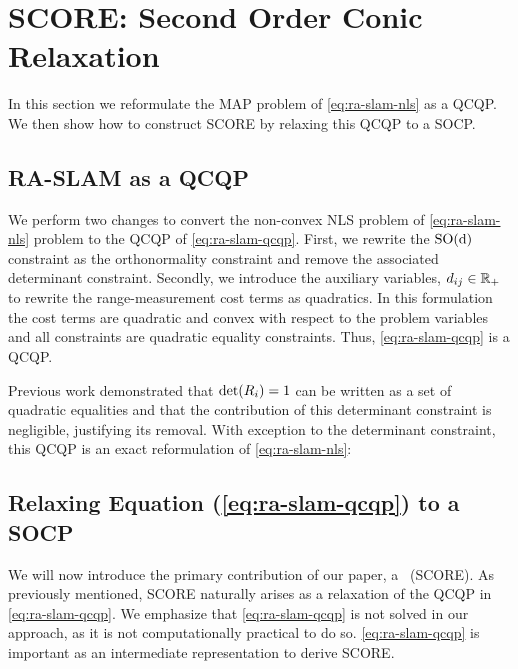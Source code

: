 \section{SCORE: Second Order Conic Relaxation}
\label{sec:ra-slam-score}
In this section we reformulate the MAP problem of \cref{eq:ra-slam-nls} as a
QCQP. We then show how to construct SCORE by relaxing this QCQP to a SOCP.

\subsection{RA-SLAM as a QCQP}
\label{sec:ra-slam-qcqp}
 We perform two changes to convert the non-convex NLS problem of
 \cref{eq:ra-slam-nls} problem to the QCQP of \cref{eq:ra-slam-qcqp}. First, we
 rewrite the $\operatorname{{\operatorname{SO}}(d)}$ constraint as the orthonormality constraint and remove the
 associated determinant constraint.  Secondly, we introduce the auxiliary
 variables, $d_{ij} \in \mathbb{R}_{+}$ to rewrite the range-measurement cost
 terms as quadratics.  In this formulation the cost terms are quadratic and
 convex with respect to the problem variables and all constraints are quadratic
 equality constraints. Thus, \cref{eq:ra-slam-qcqp} is a QCQP.

Previous work \cite{carlone15iros,briales17ral,tron15rssworkshop} demonstrated
that $\det(R_i) = 1$ can be written as a set of quadratic equalities and that
the contribution of this determinant constraint is negligible, justifying its
removal. With exception to the determinant constraint, this QCQP is an exact
reformulation of \cref{eq:ra-slam-nls}:
\RaSlamQcqp

\subsection{Relaxing Equation (\ref{eq:ra-slam-qcqp}) to a SOCP}
\label{sec:ra-slam-socp}

We will now introduce the primary contribution of our paper, a \ScoreFull~(SCORE). As
previously mentioned, SCORE naturally arises as a relaxation of the QCQP in
\cref{eq:ra-slam-qcqp}. We emphasize that \cref{eq:ra-slam-qcqp} is not solved
in our approach, as it is not computationally practical to do so.
\cref{eq:ra-slam-qcqp} is important as an intermediate representation to derive
SCORE.

